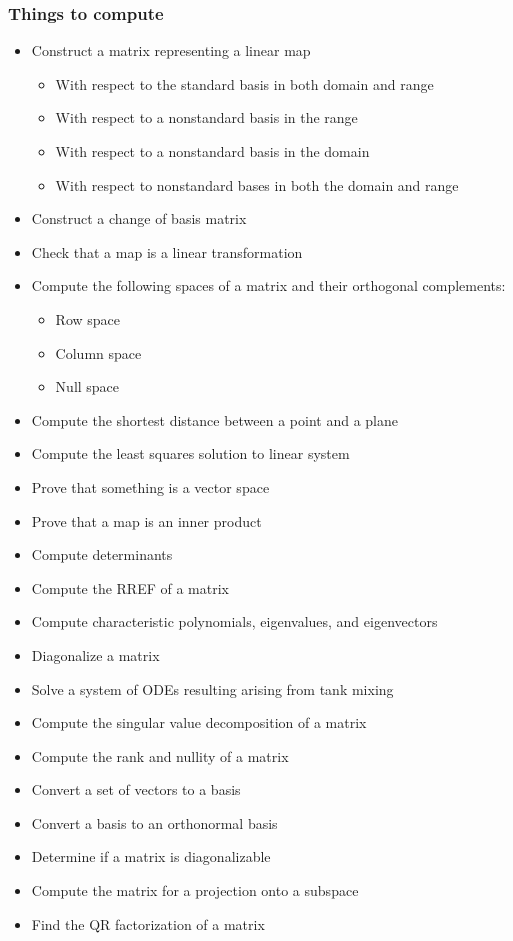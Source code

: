 \hypertarget{things-to-compute}{%
\subsubsection{Things to compute}\label{things-to-compute}}

\begin{itemize}
\tightlist
\item
  Construct a matrix representing a linear map

  \begin{itemize}
  \tightlist
  \item
    With respect to the standard basis in both domain and range
  \item
    With respect to a nonstandard basis in the range
  \item
    With respect to a nonstandard basis in the domain
  \item
    With respect to nonstandard bases in both the domain and range
  \end{itemize}
\item
  Construct a change of basis matrix
\item
  Check that a map is a linear transformation
\item
  Compute the following spaces of a matrix and their orthogonal
  complements:

  \begin{itemize}
  \tightlist
  \item
    Row space
  \item
    Column space
  \item
    Null space
  \end{itemize}
\item
  Compute the shortest distance between a point and a plane
\item
  Compute the least squares solution to linear system
\item
  Prove that something is a vector space
\item
  Prove that a map is an inner product
\item
  Compute determinants
\item
  Compute the RREF of a matrix
\item
  Compute characteristic polynomials, eigenvalues, and eigenvectors
\item
  Diagonalize a matrix
\item
  Solve a system of ODEs resulting arising from tank mixing
\item
  Compute the singular value decomposition of a matrix
\item
  Compute the rank and nullity of a matrix
\item
  Convert a set of vectors to a basis
\item
  Convert a basis to an orthonormal basis
\item
  Determine if a matrix is diagonalizable
\item
  Compute the matrix for a projection onto a subspace
\item
  Find the QR factorization of a matrix
\end{itemize}

